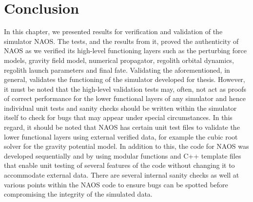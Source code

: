 \FloatBarrier

\section{Conclusion}
\label{sec:conclusion_vv}
In this chapter, we presented results for verification and validation of the simulator \gls{NAOS}. The tests, and the results from it, proved the authenticity of \gls{NAOS} as we verified its high-level functioning layers such as the perturbing force models, gravity field model, numerical propagator, regolith orbital dynamics, regolith launch parameters and final fate. Validating the aforementioned, in general, validates the functioning of the simulator developed for thesis. However, it must be noted that the high-level validation tests may, often, not act as proofs of correct performance for the lower functional layers of any simulator and hence individual unit tests and sanity checks should be written within the simulator itself to check for bugs that may appear under special circumstances.
%
\newline\newline
%
In this regard, it should be noted that \gls{NAOS} has certain unit test files to validate the lower functional layers using external verified data, for example the cubic root solver for the gravity potential model. In addition to this, the code for \gls{NAOS} was developed sequentially and by using modular functions and C++ template files that enable unit testing of several features of the code without changing it to accommodate external data. There are several internal sanity checks as well at various points within the \gls{NAOS} code to ensure bugs can be spotted before compromising the integrity of the simulated data.
